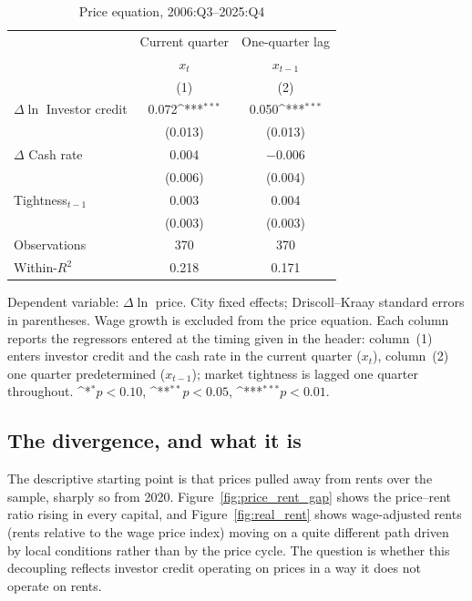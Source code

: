 \documentclass[preprint,11pt,authoryear]{elsarticle}
\newcommand{\sym}[1]{\ifmmode^{#1}\else\(^{#1}\)\fi}
\begin{document}
\begin{table}[t]
\centering
\begin{threeparttable}
\caption{Price equation, 2006:Q3--2025:Q4}
\label{tab:price_eq}
\begin{tabular}{lcc}
\toprule
 & \multicolumn{1}{c}{Current quarter} & \multicolumn{1}{c}{One-quarter lag} \\
 & \multicolumn{1}{c}{$x_{t}$} & \multicolumn{1}{c}{$x_{t-1}$} \\
 & (1) & (2) \\
\midrule
$\Delta\ln$ Investor credit   & 0.072\sym{***} & 0.050\sym{***} \\
                              & (0.013) & (0.013) \\
$\Delta$ Cash rate            & 0.004 & $-0.006$ \\
                              & (0.006) & (0.004) \\
Tightness$_{t-1}$             & 0.003 & 0.004 \\
                              & (0.003) & (0.003) \\
\midrule
Observations                  & 370 & 370 \\
Within-$R^2$                  & 0.218 & 0.171 \\
\bottomrule
\end{tabular}
\begin{tablenotes}[flushleft]\footnotesize
\item Dependent variable: $\Delta\ln$ price. City fixed effects; Driscoll--Kraay
standard errors in parentheses. Wage growth is excluded from the price equation.
Each column reports the regressors entered at the timing given in the header:
column~(1) enters investor credit and the cash rate in the current quarter
($x_{t}$), column~(2) one quarter predetermined ($x_{t-1}$); market tightness is
lagged one quarter throughout.
\sym{*}$p<0.10$, \sym{**}$p<0.05$, \sym{***}$p<0.01$.
\end{tablenotes}
\end{threeparttable}
\end{table}

\subsection{The divergence, and what it is}
\label{sec:divergence}

The descriptive starting point is that prices pulled away from rents over the
sample, sharply so from 2020. Figure~\ref{fig:price_rent_gap} shows the price--rent
ratio rising in every capital, and Figure~\ref{fig:real_rent} shows
wage-adjusted rents (rents relative to the wage price index)
moving on a quite different path driven by local conditions
rather than by the price cycle. The question is whether this decoupling reflects
investor credit operating on prices in a way it does not operate on rents.
\end{document}
